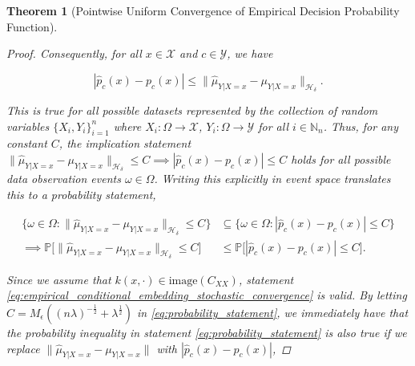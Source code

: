\documentclass{article}
\newtheorem{theorem}{Theorem}[section]
\begin{document}
\begin{theorem}[Pointwise Uniform Convergence of Empirical Decision Probability Function]
\begin{proof}
		
		Consequently, for all $x \in \mathcal{X}$ and $c \in \mathcal{Y}$, we have 
		
		\begin{equation}
			| \hat{p}_{c}(x) - p_{c}(x) | \leq \big\| \hat{\mu}_{Y | X = x} - \mu_{Y | X = x} \big\|_{\mathcal{H}_{\delta}}.
		\label{eq:uniform_convergence}
		\end{equation}
		
		This is true for all possible datasets represented by the collection of random variables $\{X_{i}, Y_{i}\}_{i = 1}^{n}$ where $X_{i} : \Omega \to \mathcal{X}$,  $Y_{i} : \Omega \to \mathcal{Y}$ for all $i \in \mathbb{N}_{n}$. Thus, for any constant $C$, the implication statement $\big\| \hat{\mu}_{Y | X = x} - \mu_{Y | X = x} \big\|_{\mathcal{H}_{\delta}} \leq C \implies | \hat{p}_{c}(x) - p_{c}(x) | \leq C$ holds for all possible data observation events $\omega \in \Omega$. Writing this explicitly in event space translates this to a probability statement,

		\begin{equation}
		\begin{aligned}
			\{\omega \in \Omega : \big\| \hat{\mu}_{Y | X = x} - \mu_{Y | X = x} \big\|_{\mathcal{H}_{\delta}} \leq C\} &\subseteq \{\omega \in \Omega : | \hat{p}_{c}(x) - p_{c}(x) | \leq C\} \\
			\implies \mathbb{P}\Big[\big\| \hat{\mu}_{Y | X = x} - \mu_{Y | X = x} \big\|_{\mathcal{H}_{\delta}} \leq C\Big] &\leq \mathbb{P}\Big[| \hat{p}_{c}(x) - p_{c}(x) | \leq C \Big].
		\label{eq:probability_statement}
		\end{aligned}
		\end{equation}
		
		Since we assume that $k(x, \cdot) \in \mathrm{image}(C_{XX})$, statement \eqref{eq:empirical_conditional_embedding_stochastic_convergence} is valid. By letting $C = M_{\epsilon} ((n \lambda)^{-\frac{1}{2}} + \lambda^{\frac{1}{2}})$ in \eqref{eq:probability_statement}, we immediately have that the probability inequality in statement \eqref{eq:probability_statement} is also true if we replace $\| \hat{\mu}_{Y | X = x} - \mu_{Y | X = x} \|$ with $| \hat{p}_{c}(x) - p_{c}(x) |$, %
		

\end{proof}
\end{theorem}
\end{document}

